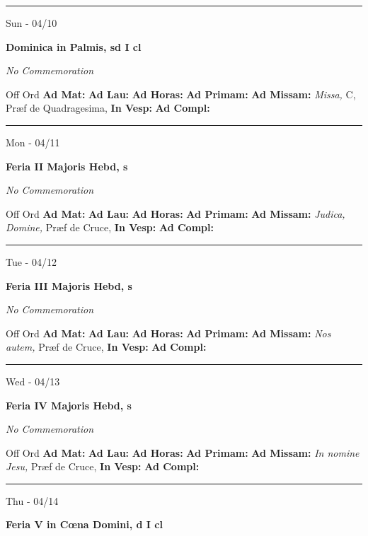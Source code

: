 \documentclass[letterpaper, 10pt]{article}
\begin{document}
\hrule
\begin{center}
Sun - 04/10
\end{center}\textbf{ \large Dominica in Palmis, \textnormal{\normalsize sd I cl}}

\textit{No Commemoration}\begin{justify}
Off Ord
\textbf{Ad Mat: }
\textbf{Ad Lau: }
\textbf{Ad Horas: }
\textbf{Ad Primam: }
\textbf{Ad Missam:} \textit{Missa, } C, Præf de Quadragesima, 
\textbf{In Vesp: }
\textbf{Ad Compl: }\end{justify}



\hrule
\begin{center}
Mon - 04/11
\end{center}\textbf{ \large Feria II Majoris Hebd, \textnormal{\normalsize s}}

\textit{No Commemoration}\begin{justify}
Off Ord
\textbf{Ad Mat: }
\textbf{Ad Lau: }
\textbf{Ad Horas: }
\textbf{Ad Primam: }
\textbf{Ad Missam:} \textit{Judica, Domine, } Præf de Cruce, 
\textbf{In Vesp: }
\textbf{Ad Compl: }\end{justify}



\hrule
\begin{center}
Tue - 04/12
\end{center}\textbf{ \large Feria III Majoris Hebd, \textnormal{\normalsize s}}

\textit{No Commemoration}\begin{justify}
Off Ord
\textbf{Ad Mat: }
\textbf{Ad Lau: }
\textbf{Ad Horas: }
\textbf{Ad Primam: }
\textbf{Ad Missam:} \textit{Nos autem, } Præf de Cruce, 
\textbf{In Vesp: }
\textbf{Ad Compl: }\end{justify}



\hrule
\begin{center}
Wed - 04/13
\end{center}\textbf{ \large Feria IV Majoris Hebd, \textnormal{\normalsize s}}

\textit{No Commemoration}\begin{justify}
Off Ord
\textbf{Ad Mat: }
\textbf{Ad Lau: }
\textbf{Ad Horas: }
\textbf{Ad Primam: }
\textbf{Ad Missam:} \textit{In nomine Jesu, } Præf de Cruce, 
\textbf{In Vesp: }
\textbf{Ad Compl: }\end{justify}



\hrule
\begin{center}
Thu - 04/14
\end{center}\textbf{ \large Feria V in Cœna Domini, \textnormal{\normalsize d I cl}}
\end{document}
